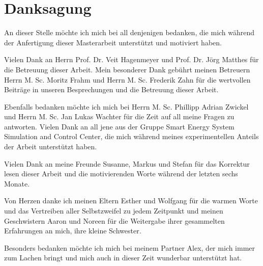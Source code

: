 \chapter*{Danksagung}
\thispagestyle{empty}
An dieser Stelle möchte ich mich bei all denjenigen bedanken, die mich während der Anfertigung dieser Masterarbeit unterstützt und motiviert haben.\newline

\noindent
Vielen Dank an Herrn Prof. Dr. Veit Hagenmeyer und Prof. Dr. Jörg Matthes für die Betreuung dieser Arbeit.\newline
Mein besonderer Dank gebührt meinen Betreuern Herrn M. Sc. Moritz Frahm und Herrn M. Sc. Frederik Zahn für die wertvollen Beiträge in unseren Besprechungen und die Betreuung dieser Arbeit.\newline

\noindent
Ebenfalls bedanken möchte ich mich bei Herrn M. Sc. Phillipp Adrian Zwickel und Herrn M. Sc. Jan Lukas Wachter für die Zeit auf all meine Fragen zu antworten.  Vielen Dank an all jene aus der Gruppe Smart Energy System Simulation and Control Center, die mich während meines experimentellen Anteils der Arbeit unterstützt haben.\newline

\noindent
Vielen Dank an meine Freunde Susanne, Markus und Stefan für das Korrektur lesen dieser Arbeit und die motivierenden Worte während der letzten sechs Monate.\newline

\noindent
Von Herzen danke ich meinen Eltern Esther und Wolfgang für die warmen Worte und das Vertreiben aller Selbstzweifel zu jedem Zeitpunkt und meinen Geschwistern Aaron und Noreen für die Weitergabe ihrer gesammelten Erfahrungen an mich, ihre kleine Schwester.\newline

\noindent
Besonders bedanken möchte ich mich bei meinem Partner Alex, der mich immer zum Lachen bringt und mich auch in dieser Zeit wunderbar unterstützt hat.\newline
